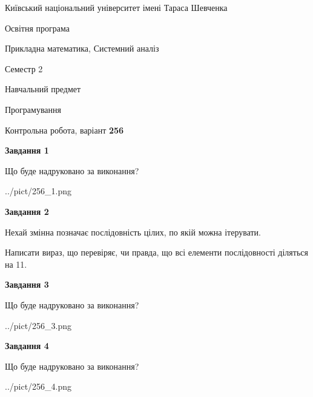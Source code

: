 \documentclass[12pt, ukrainian]{article}
\begin{document}
{{\begin {small}\par
{ \center  Київський національний університет імені Тараса Шевченка \par}
{\parbox {5 cm}{Освітня програма \hfill}{\parbox {8 cm}{Прикладна математика, Системний аналіз \hfill}}\parbox {5 cm}{\hfill Семестр 2}}\par
{\parbox {5 cm} {Навчальний предмет \hfill}\parbox {7 cm}{Програмування \hfill}\parbox {6cm}{\hfill}\par}\vspace{-7pt} \end{small}}{\center Контрольна робота, варіант  \No \textbf
{ 256 }\par}}
{
\begin {large}
{\begin {center}\textbf{Завдання 1}\end {center}}\par
Що буде надруковано за виконання?\par\par
\begin{center}
	{../pict/256_1.png}
\end{center}
\newpage

{\begin {center}\textbf{Завдання 2}\end {center}}\par
Нехай змінна  позначає послідовність цілих, по якій можна ітерувати.

Написати вираз, що перевіряє, чи правда, що всі елементи послідовності діляться на 11.\par
\newpage

{\begin {center}\textbf{Завдання 3}\end {center}}\par
Що буде надруковано за виконання?\par
\begin{center}
	{../pict/256_3.png}
\end{center}
\newpage

{\begin {center}\textbf{Завдання 4}\end {center}}\par
Що буде надруковано за виконання?\par
\begin{center}
	{../pict/256_4.png}
\end{center}
\newpage


\end{large}}
\end{document}
